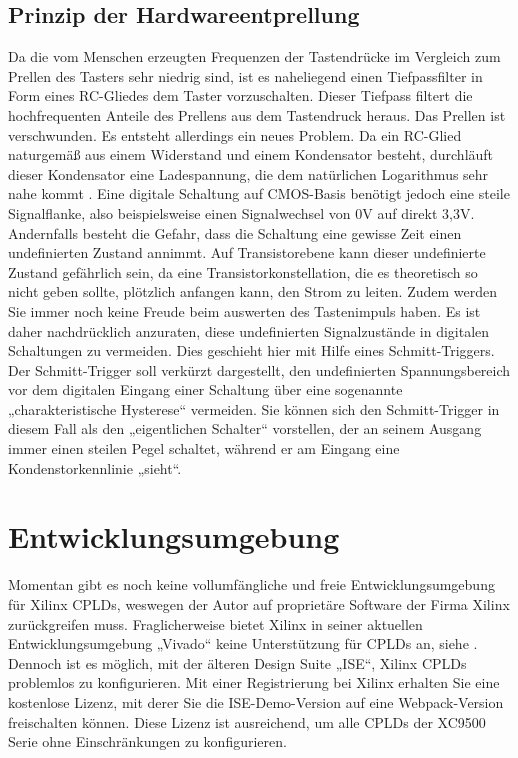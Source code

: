 \documentclass{article}
\begin{document}
\subsection{Prinzip der Hardwareentprellung}
Da die vom Menschen erzeugten Frequenzen der Tastendrücke im Vergleich zum Prellen des Tasters sehr niedrig sind, ist es naheliegend einen Tiefpassfilter in Form eines RC-Gliedes dem Taster vorzuschalten. 
Dieser Tiefpass filtert die hochfrequenten Anteile des Prellens aus dem Tastendruck heraus. Das Prellen ist verschwunden. Es entsteht allerdings ein neues Problem. Da ein RC-Glied naturgemäß aus einem Widerstand und einem Kondensator besteht, durchläuft dieser Kondensator eine Ladespannung, die dem natürlichen Logarithmus sehr nahe kommt \autocite{RC}. Eine digitale Schaltung auf CMOS-Basis benötigt jedoch eine steile Signalflanke, also beispielsweise einen Signalwechsel von 0V auf direkt 3,3V. Andernfalls besteht die Gefahr, dass die Schaltung eine gewisse Zeit einen undefinierten Zustand annimmt. Auf Transistorebene kann dieser undefinierte Zustand gefährlich sein, da eine Transistorkonstellation, die es theoretisch so nicht geben sollte, plötzlich anfangen kann, den Strom zu leiten. Zudem werden Sie immer noch keine Freude beim auswerten des Tastenimpuls haben. Es ist daher nachdrücklich anzuraten, diese undefinierten Signalzustände in digitalen Schaltungen zu vermeiden. Dies geschieht hier mit Hilfe eines Schmitt-Triggers. Der Schmitt-Trigger soll verkürzt dargestellt, den undefinierten Spannungsbereich vor dem digitalen Eingang einer Schaltung über eine sogenannte „charakteristische Hysterese“ vermeiden. Sie können sich den Schmitt-Trigger in diesem Fall als den „eigentlichen Schalter“ vorstellen, der an seinem Ausgang immer einen steilen Pegel schaltet, während er am Eingang eine Kondenstorkennlinie „sieht“.


\section{Entwicklungsumgebung}

Momentan gibt es noch keine vollumfängliche und freie \autocite{FSF} Entwicklungsumgebung für Xilinx CPLDs, weswegen der Autor auf proprietäre Software der Firma Xilinx zurückgreifen muss.
Fraglicherweise bietet Xilinx in seiner aktuellen Entwicklungsumgebung „Vivado“ keine Unterstützung für CPLDs an, siehe \autocite[17]{Vivado}. Dennoch ist es möglich, mit der älteren Design Suite „ISE“, Xilinx CPLDs problemlos zu konfigurieren.
Mit einer Registrierung bei Xilinx erhalten Sie eine kostenlose Lizenz, mit derer Sie die ISE-Demo-Version auf eine Webpack-Version \autocite{ISE-Web} freischalten können. Diese Lizenz ist ausreichend, um alle CPLDs der XC9500 Serie ohne Einschränkungen zu konfigurieren.
\end{document}
